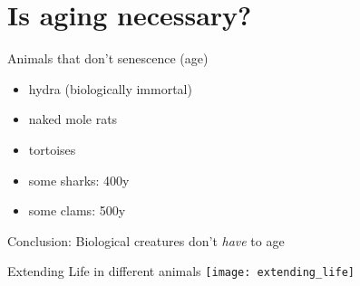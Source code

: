 \section{Is aging necessary?}


\begin{frame}[c]{Animals that don't senescence (age)}
    \large
    \begin{itemize}[<+(1)->]
        \item hydra (biologically immortal) \cite{martinez1998mortality}
        \item naked mole rats \cite{ruby2018naked}
        \item tortoises \cite{miller2001escaping}
        \item some sharks: 400y \cite{Greenlan67:online}
        \item some clams: 500y \cite{munro2012extreme}
    \end{itemize}
    \pause
    Conclusion: Biological creatures don't {\em have} to age
\end{frame}



\begin{frame}[c]{Extending Life in different animals}
    \texttt{[image: extending\_life]} \\
    \cite{bulterijs2015time}
\end{frame}


